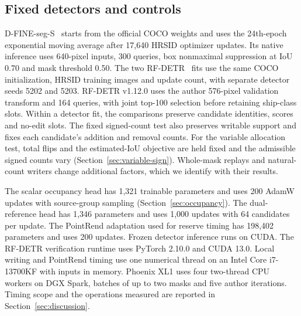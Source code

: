 \subsection{Fixed detectors and controls}
D-FINE-seg-S~\cite{dfine} starts from the official COCO weights and uses the 24th-epoch exponential moving average after 17,640 HRSID optimizer updates. Its native inference uses 640-pixel inputs, 300 queries, box nonmaximal suppression at IoU 0.70 and mask threshold 0.50. The two RF-DETR~\cite{rfdetr} fits use the same COCO initialization, HRSID training images and update count, with separate detector seeds 5202 and 5203. RF-DETR v1.12.0 uses the author 576-pixel validation transform and 164 queries, with joint top-100 selection before retaining ship-class slots. Within a detector fit, the comparisons preserve candidate identities, scores and no-edit slots. The fixed signed-count test also preserves writable support and fixes each candidate's addition and removal counts. For the variable allocation test, total flips and the estimated-IoU objective are held fixed and the admissible signed counts vary (Section~\ref{sec:variable-sign}). Whole-mask replays and natural-count writers change additional factors, which we identify with their results.

The scalar occupancy head has 1,321 trainable parameters and uses 200 AdamW updates with source-group sampling (Section~\ref{sec:occupancy}). The dual-reference head has 1,346 parameters and uses 1,000 updates with 64 candidates per update. The PointRend adaptation used for reserve timing has 198,402 parameters and uses 200 updates. Frozen detector inference runs on CUDA. The RF-DETR verification runtime uses PyTorch 2.10.0 and CUDA 13.0. Local writing and PointRend timing use one numerical thread on an Intel Core i7-13700KF with inputs in memory. Phoenix XL1 uses four two-thread CPU workers on DGX Spark, batches of up to two masks and five author iterations. Timing scope and the operations measured are reported in Section~\ref{sec:discussion}.

